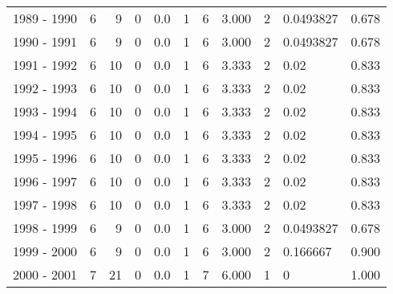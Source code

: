 \begin{tabular}{lrrrrrrrllr}
1989 - 1990 &        6 &        9 &                 0 &               0.0 &                       1 &                          6 &       3.000 &             2 &  0.0493827 &             0.678 \\
1990 - 1991 &        6 &        9 &                 0 &               0.0 &                       1 &                          6 &       3.000 &             2 &  0.0493827 &             0.678 \\
1991 - 1992 &        6 &       10 &                 0 &               0.0 &                       1 &                          6 &       3.333 &             2 &       0.02 &             0.833 \\
1992 - 1993 &        6 &       10 &                 0 &               0.0 &                       1 &                          6 &       3.333 &             2 &       0.02 &             0.833 \\
1993 - 1994 &        6 &       10 &                 0 &               0.0 &                       1 &                          6 &       3.333 &             2 &       0.02 &             0.833 \\
1994 - 1995 &        6 &       10 &                 0 &               0.0 &                       1 &                          6 &       3.333 &             2 &       0.02 &             0.833 \\
1995 - 1996 &        6 &       10 &                 0 &               0.0 &                       1 &                          6 &       3.333 &             2 &       0.02 &             0.833 \\
1996 - 1997 &        6 &       10 &                 0 &               0.0 &                       1 &                          6 &       3.333 &             2 &       0.02 &             0.833 \\
1997 - 1998 &        6 &       10 &                 0 &               0.0 &                       1 &                          6 &       3.333 &             2 &       0.02 &             0.833 \\
1998 - 1999 &        6 &        9 &                 0 &               0.0 &                       1 &                          6 &       3.000 &             2 &  0.0493827 &             0.678 \\
1999 - 2000 &        6 &        9 &                 0 &               0.0 &                       1 &                          6 &       3.000 &             2 &   0.166667 &             0.900 \\
2000 - 2001 &        7 &       21 &                 0 &               0.0 &                       1 &                          7 &       6.000 &             1 &          0 &             1.000 \\

\end{tabular}
